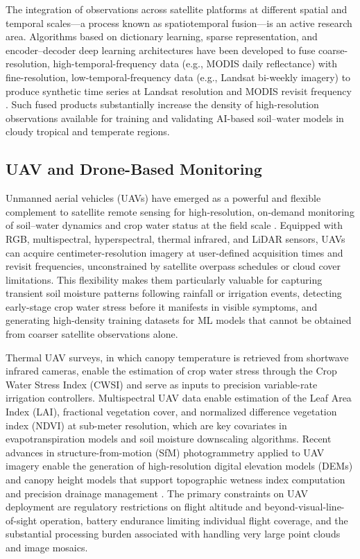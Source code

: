 \documentclass[land,review,accept,pdftex,oneauthor]{Definitions/mdpi}
\begin{document}
The integration of observations across satellite platforms at different spatial and temporal scales---a process known as spatiotemporal fusion---is an active research area. Algorithms based on dictionary learning, sparse representation, and encoder--decoder deep learning architectures have been developed to fuse coarse-resolution, high-temporal-frequency data (e.g., MODIS daily reflectance) with fine-resolution, low-temporal-frequency data (e.g., Landsat bi-weekly imagery) to produce synthetic time series at Landsat resolution and MODIS revisit frequency \citep{gao2017blending}. Such fused products substantially increase the density of high-resolution observations available for training and validating AI-based soil--water models in cloudy tropical and temperate regions.

\subsection{UAV and Drone-Based Monitoring}

Unmanned aerial vehicles (UAVs) have emerged as a powerful and flexible complement to satellite remote sensing for high-resolution, on-demand monitoring of soil--water dynamics and crop water status at the field scale \citep{mulla2013twenty}. Equipped with RGB, multispectral, hyperspectral, thermal infrared, and LiDAR sensors, UAVs can acquire centimeter-resolution imagery at user-defined acquisition times and revisit frequencies, unconstrained by satellite overpass schedules or cloud cover limitations. This flexibility makes them particularly valuable for capturing transient soil moisture patterns following rainfall or irrigation events, detecting early-stage crop water stress before it manifests in visible symptoms, and generating high-density training datasets for ML models that cannot be obtained from coarser satellite observations alone.

Thermal UAV surveys, in which canopy temperature is retrieved from shortwave infrared cameras, enable the estimation of crop water stress through the Crop Water Stress Index (CWSI) \citep{jones2004use} and serve as inputs to precision variable-rate irrigation controllers. Multispectral UAV data {enable estimation of} the Leaf Area Index (LAI), fractional vegetation cover, and normalized difference vegetation index (NDVI) at sub-meter resolution, which are key covariates in evapotranspiration models and soil moisture downscaling algorithms. Recent advances in structure-from-motion (SfM) photogrammetry applied to UAV imagery enable the generation of high-resolution digital elevation models (DEMs) and canopy height models that support topographic wetness index computation and precision drainage management \citep{yao2019uav}. The primary constraints on UAV deployment are regulatory restrictions on flight altitude and beyond-visual-line-of-sight operation, battery endurance limiting individual flight coverage, and the substantial processing burden associated with handling very large point clouds and image mosaics.
\end{document}
